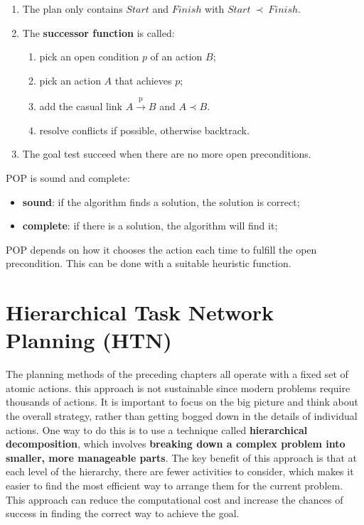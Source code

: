 \documentclass{article}
\begin{document}
\begin{itemize}
\begin{enumerate}
    \item The plan only contains $Start$ and $Finish$ with $Start\ \prec\ Finish$.
    \item The \textbf{successor function} is called:
    \begin{enumerate}
        \item pick an open condition $p$ of an action $B$;
        \item pick an action $A$ that achieves $p$;
        \item add the casual link $A \xrightarrow{\text{p}} B$ and $A \prec B$.
        \item resolve conflicts if possible, otherwise backtrack.
    \end{enumerate}
    \item The goal test succeed when there are no more open preconditions.
\end{enumerate}

POP is sound and complete: 
\begin{itemize}
    \item \textbf{sound}: if the algorithm finds a solution, the solution is correct;
    \item \textbf{complete}: if there is a solution, the algorithm will find it;
\end{itemize}

POP depends on how it chooses the action each time to fulfill the open precondition. This can be done with a suitable heuristic function.

\newpage

\section{Hierarchical Task Network Planning (HTN)}

The planning methods of the preceding chapters all operate with a fixed set of atomic actions. this approach is not sustainable since modern problems require thousands of actions. It is important to focus on the big picture and think about the overall strategy, rather than getting bogged down in the details of individual actions. One way to do this is to use a technique called \textbf{hierarchical decomposition}, which involves \textbf{breaking down a complex problem into smaller, more manageable parts}. The key benefit of this approach is that at each level of the hierarchy, there are fewer activities to consider, which makes it easier to find the most efficient way to arrange them for the current problem. This approach can reduce the computational cost and increase the chances of success in finding the correct way to achieve the goal. \\


\end{itemize}
\end{document}
